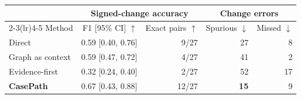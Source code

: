 \begin{tabular}{lrrrr}
\toprule
& \multicolumn{2}{c}{Signed-change accuracy} & \multicolumn{2}{c}{Change errors} \\
\cmidrule(lr){2-3}\cmidrule(lr){4-5}
Method & F1 [95\% CI] $\uparrow$ & Exact pairs $\uparrow$ & Spurious $\downarrow$ & Missed $\downarrow$ \\
\midrule
Direct & 0.59 [0.40, 0.76] & 9/27 & 27 & 8 \\
Graph as context & 0.59 [0.47, 0.72] & 4/27 & 41 & 2 \\
Evidence-first & 0.32 [0.24, 0.40] & 2/27 & 52 & 17 \\
\addlinespace[2pt]
\textbf{CasePath} & 0.67 [0.43, 0.88] & 12/27 & \textbf{15} & 9 \\
\bottomrule
\end{tabular}

